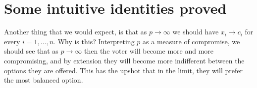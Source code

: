 \documentclass[
10pt, %
a4paper, %
oneside, %
headinclude,footinclude, %
BCOR5mm, %
]{scrartcl}
\theoremstyle{definition} %
\theoremstyle{plain} %
\theoremstyle{remark} %
\begin{document}
\section{Some intuitive identities proved}

Another thing that we would expect, is that as $p \rightarrow \infty$ we should have $x_i \rightarrow c_i$ for every $i = 1,\ldots,n$. Why is this? Interpreting $p$ as a measure of compromise, we should see that as $p \rightarrow \infty$ then the voter will become more and more compromising, and by extension they will become more indifferent between the options they are offered. This has the upshot that in the limit, they will prefer the most balanced option.


\renewcommand{\refname}{\spacedlowsmallcaps{References}} %




\end{document}
